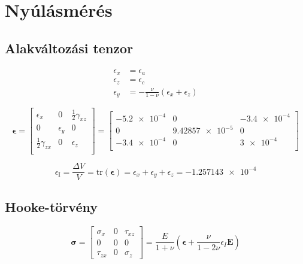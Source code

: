 \section{Nyúlásmérés}

\subsection{Alakváltozási tenzor}
\begin{align*}
	\epsilon_x &= \epsilon_a \\
	\epsilon_z &= \epsilon_c \\
	\epsilon_y &= -\frac{\nu}{1-\nu}(\epsilon_x + \epsilon_z)
\end{align*}

\begin{equation*}
	\pmb{\epsilon} = \begin{bmatrix}
		\epsilon_x & 0 & \frac{1}{2}\gamma_{xz} \\
		0 & \epsilon_y & 0 \\
		\frac{1}{2}\gamma_{zx} & 0 & \epsilon_z \\
	\end{bmatrix} = \begin{bmatrix}
		\num{-5.2e-4} & 0 & \num{-3.4e-4} \\
		0 & \num{9.42857e-5} & 0 \\
		\num{-3.4e-4} & 0 & \num{3e-4} \\
	\end{bmatrix}
\end{equation*}

\begin{equation*}
	\epsilon_\text{I} = \frac{\Delta V}{V} = \text{tr}(\pmb{\epsilon}) = \epsilon_x + \epsilon_y + \epsilon_z = \num{-1.257143e-4}
\end{equation*}

\newpage

\subsection{Hooke-törvény}

\begin{equation*}
	\pmb{\sigma} = \begin{bmatrix}
		\sigma_x & 0 & \tau_{xz} \\
		0 & 0 & 0 \\
		\tau_{zx} & 0 & \sigma_z
	\end{bmatrix} = \frac{E}{1+\nu}\left(\pmb{\epsilon} + \frac{\nu}{1-2\nu} \epsilon_I \pmb{E}\right)
\end{equation*}

